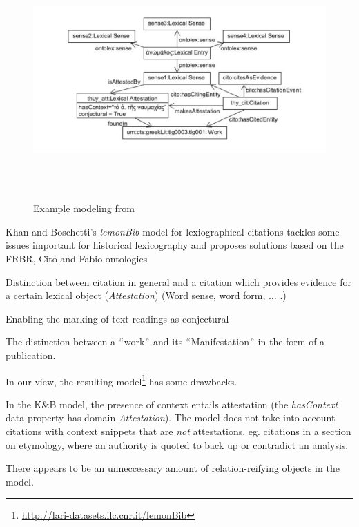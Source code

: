 \documentclass[10pt]{article}
\let\tempone\itemize
\let\temptwo\enditemize
\renewenvironment{itemize}{\tempone\setlength\itemsep{-0.5pt}}{\temptwo}
\begin{document}
\begin{figure}[H]
	\begin{Center}
		\includegraphics[width=6.27in,height=3.6in]{./image10.png}
	\end{Center}
	\caption{Example modeling from \cite{KhanBoschetti}}
\end{figure}

 Khan and Boschetti’s \textit{lemonBib} model for lexiographical citations tackles some issues important for historical lexicography and proposes solutions based on the FRBR, Cito and Fabio ontologies\cite{PeroniShotton}

\begin{itemize}
\item Distinction between citation in general and a citation which provides evidence for a certain lexical object (\textit{Attestation}) (Word sense, word form, $ \ldots $ .)

\item	Enabling the marking of text readings as conjectural

\item The distinction between a $``$work$"$  and its $``$Manifestation$"$  in the form of a publication.
\end{itemize}

In our view, the resulting model\footnote{\url{http://lari-datasets.ilc.cnr.it/lemonBib}} has some drawbacks.

\begin{itemize}
\item In the K$\&$B model, the presence of context entails attestation (the \textit{hasContext }data property has domain \textit{Attestation}). The model does not take into account citations with context snippets that are \textit{not} attestations, eg. citations in a section on etymology, where an authority is quoted to back up or contradict an analysis.

	\item There appears to be an unneccessary amount of relation-reifying objects in the model. 


\end{itemize}
\end{document}
